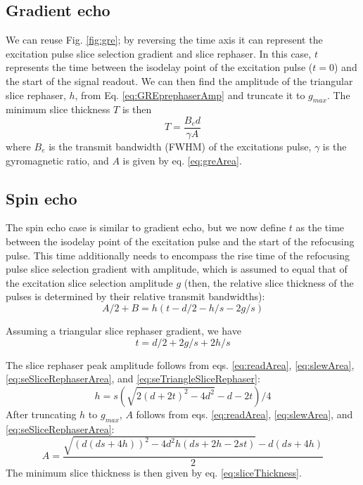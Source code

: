 \documentclass{article}
\begin{document}
\subsection{Gradient echo}
We can reuse Fig. \ref{fig:gre}; by reversing the time axis it can represent the excitation pulse slice selection gradient and slice rephaser. 
In this case, $t$ represents the time between the isodelay point of the excitation pulse ($t=0$) and the start of the signal readout. 
We can then find the amplitude of the triangular slice rephaser, $h$, from Eq. \ref{eq:GREprephaserAmp} and truncate it to $g_{max}$.
The minimum slice thickness $T$ is then
\begin{equation}
    T = \frac{B_e d}{\gamma A}
    \label{eq:sliceThickness}
\end{equation}
where $B_e$ is the transmit bandwidth (FWHM) of the excitations pulse, $\gamma$ is the gyromagnetic ratio, and $A$ is given by eq. \ref{eq:greArea}.

\subsection{Spin echo}
The spin echo case is similar to gradient echo, but we now define $t$ as the time between the isodelay point of the excitation pulse and the start of the refocusing pulse. 
This time additionally needs to encompass the rise time of the refocusing pulse slice selection gradient with amplitude, which is assumed to equal that of the excitation slice selection amplitude $g$ (then, the relative slice thickness of the pulses is determined by their relative transmit bandwidths): 
\begin{equation}
    A/2 + B = h(t-d/2-h/s-2g/s)
    \label{eq:seSliceRephaserArea}
\end{equation}

Assuming a triangular slice rephaser gradient, we have
\begin{equation}
    t = d/2 + 2g/s + 2h/s
    \label{eq:seTriangleSliceRephaser}
\end{equation}

The slice rephaser peak amplitude follows from eqs. \ref{eq:readArea}, \ref{eq:slewArea}, \ref{eq:seSliceRephaserArea}, and \ref{eq:seTriangleSliceRephaser}:
\begin{equation}
    h = s(\sqrt{2(d + 2t)^2-4d^2}- d - 2t)/4
    \label{eq:GREprephaserAmp}
\end{equation}
After truncating $h$ to $g_{max}$, $A$ follows from eqs. \ref{eq:readArea}, \ref{eq:slewArea}, and \ref{eq:seSliceRephaserArea}:
\begin{equation}
    A = \frac{\sqrt{(d(ds + 4h))^2-4d^2h(ds+2h-2st)}-d(ds + 4h)}{2}
    \label{eq:GREprephaserAmp}
\end{equation}
The minimum slice thickness is then given by eq. \ref{eq:sliceThickness}.
\end{document}
